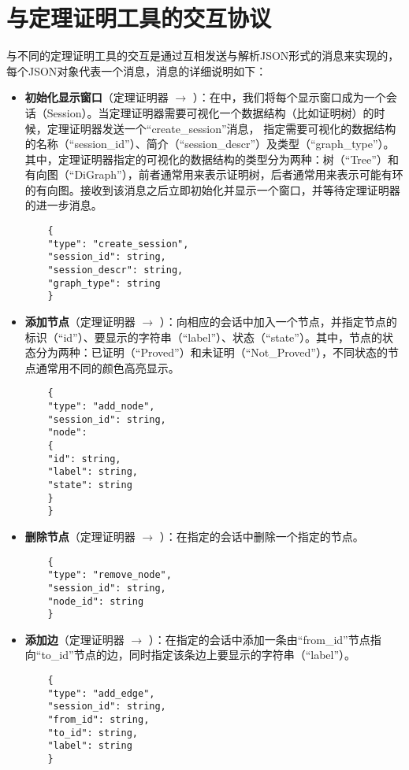 \chapter{与定理证明工具的交互协议}\label{vmdv:json:protocol}
与不同的定理证明工具的交互是通过互相发送与解析JSON形式的消息来实现的，每个JSON对象代表一个消息，消息的详细说明如下：
\begin{itemize}
	\item \textbf{初始化显示窗口}（{定理证明器} $\longrightarrow$ ）：在中，我们将每个显示窗口成为一个会话（Session）。当定理证明器需要可视化一个数据结构（比如证明树）的时候，定理证明器发送一个“create\_session”消息， 指定需要可视化的数据结构的名称（“session\_id”）、简介（“session\_descr”）及类型（“graph\_type”）。其中，定理证明器指定的可视化的数据结构的类型分为两种：树（“Tree”）和有向图（“DiGraph”），前者通常用来表示证明树，后者通常用来表示可能有环的有向图。接收到该消息之后立即初始化并显示一个窗口，并等待定理证明器的进一步消息。
	\begin{verbatim}
	{
	"type": "create_session",
	"session_id": string,
	"session_descr": string,
	"graph_type": string
	}
	\end{verbatim}
	\item \textbf{添加节点}（定理证明器 $\longrightarrow$ ）：向相应的会话中加入一个节点，并指定节点的标识（“id”）、要显示的字符串（“label”）、状态（“state”）。其中，节点的状态分为两种：已证明（“Proved”）和未证明（“Not\_Proved”），不同状态的节点通常用不同的颜色高亮显示。
	\begin{verbatim}
	{
	"type": "add_node",
	"session_id": string,
	"node":
	{
	"id": string,
	"label": string,
	"state": string
	}
	}
	\end{verbatim}
	\item \textbf{删除节点}（定理证明器 $\longrightarrow$ ）：在指定的会话中删除一个指定的节点。
	\begin{verbatim}
	{
	"type": "remove_node",
	"session_id": string,
	"node_id": string
	}
	\end{verbatim}
	\item \textbf{添加边}（定理证明器 $\longrightarrow$ ）：在指定的会话中添加一条由“from\_id”节点指向“to\_id”节点的边，同时指定该条边上要显示的字符串（“label”）。
	\begin{verbatim}
	{
	"type": "add_edge",
	"session_id": string,
	"from_id": string,
	"to_id": string,
	"label": string
	}
	\end{verbatim}

\end{itemize}
